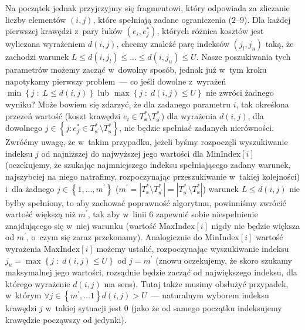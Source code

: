 Na początek jednak przyjrzyjmy się fragmentowi, który odpowiada za zliczanie liczby elementów $\left( i, j \right)$, które spełniają zadane ograniczenia ($2$--$9$).
Dla każdej pierwszej krawędzi z~pary łuków $\left( e_{i}, e^{\ast}_{j} \right)$, których różnica kosztów jest wyliczana wyrażeniem $d \left( i, j \right)$, chcemy znaleźć parę indeksów $\left( j_{l}, j_{u} \right)$ taką, że zachodzi warunek $L \leqslant d \left( i, j_{l} \right) \leqslant \dots \leqslant d \left( i, j_{u} \right) \leqslant U$.
Nasze poszukiwania tych parametrów możemy zacząć w~dowolny sposób, jednak już w~tym kroku napotykamy pierwszy problem~--- co jeśli dowolne z~wyrażeń $\min \left\{ j \; : \; L \leqslant d \left( i, j \right) \right\}$ lub $\max \left\{ j \; : \; d \left( i, j \right) \leqslant U \right\}$ nie zwróci żadnego wyniku?
Może bowiem się zdarzyć, że dla zadanego parametru $i$, tak określona przezeń wartość (koszt krawędzi $e_{i} \in T^{\ast}_{\textbf{s}} \setminus T^{\ast}_{\textbf{s}^{\prime}}$) dla wyrażenia $d \left( i, j \right)$, dla dowolnego $j \in \left\{ j : e^{\ast}_{j} \in T^{\ast}_{\textbf{s}^{\prime}} \setminus T^{\ast}_{\textbf{s}} \right\}$, nie będzie spełniać zadanych nierówności.
Zwróćmy uwagę, że w~takim przypadku, jeżeli byśmy rozpoczęli wyszukiwanie indeksu $j$ od najniższej do najwyższej jego wartości dla $\text{MinIndex} \left[ i \right]$ (oczekujemy, że szukając najmniejszego indeksu spełniającego zadany warunek, najszybciej na niego natrafimy, rozpoczynając przeszukiwanie w~takiej kolejności) i~dla żadnego $j \in \left\{ 1, \dots, m^{\prime} \right\}$ ($m^{\prime} = \left| T^{\ast}_{\textbf{s}} \setminus T^{\ast}_{\textbf{s}^{\prime}} \right| = \left| T^{\ast}_{\textbf{s}^{\prime}} \setminus T^{\ast}_{\textbf{s}} \right|$) warunek $L \leqslant d \left( i, j \right)$ nie byłby spełniony, to aby zachować poprawność algorytmu, powinniśmy zwrócić wartość większą niż $m^{\prime}$, tak aby w~linii $6$ zapewnić sobie niespełnienie znajdującego się w~niej warunku (wartość $\text{MaxIndex} \left[ i \right]$ nigdy nie będzie większa od $m^{\prime}$, o~czym się zaraz przekonamy).
Analogicznie do $\text{MinIndex} \left[ i \right]$ wartość wyrażenia $\text{MaxIndex} \left[ i \right]$ możemy ustalić, rozpoczynając wyszukiwanie indeksu $j_{u} = \max \left\{ j \; : \; d \left( i, j \right) \leqslant U \right\}$ od $j = m^{\prime}$ (znowu oczekujemy, że skoro szukamy maksymalnej jego wartości, rozsądnie będzie zacząć od największego indeksu, dla którego wyrażenie $d \left( i, j \right)$ ma sens).
Tutaj także musimy obsłużyć przypadek, w~którym $\forall j \in \left\{ m^{\prime}, \dots 1 \right\} d \left( i, j \right) > U$~--- naturalnym wyborem indeksu krawędzi $j$ w~takiej sytuacji jest $0$ (jako że od samego początku indeksujemy krawędzie począwszy od jedynki).

